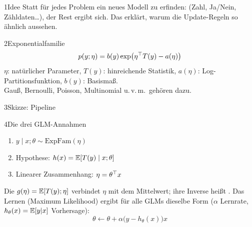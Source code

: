 
\begin{hngrid}
%
\begin{hnp}[raster multicolumn=2,acc=hnorange]{1}{Idee}
Statt für jedes Problem ein neues Modell zu erfinden:  (Zahl, Ja/Nein, Zähldaten\ldots), der Rest ergibt sich. Das erklärt, warum die Update-Regeln so ähnlich aussehen.
\end{hnp}
%
\begin{hnp}[raster multicolumn=2,acc=hnpurple]{2}{Exponentialfamilie}
\[ p(y;\eta)=b(y)\exp\bigl(\eta^{\top} T(y)-a(\eta)\bigr) \]
$\eta$: natürlicher Parameter, $T(y)$: hinreichende Statistik, $a(\eta)$: Log-Partitionsfunktion, $b(y)$: Basismaß.\\
Gauß, Bernoulli, Poisson, Multinomial u.\,v.\,m.\ gehören dazu.
\end{hnp}
%
\begin{hnp}[raster multicolumn=2,acc=hnteal]{3}{Skizze: Pipeline}
\centering
{}
\end{hnp}
%
\begin{hnp}[raster multicolumn=3,acc=hnnavy]{4}{Die drei GLM-Annahmen}
\begin{enumerate}
\item $y\mid x;\theta\sim\mathrm{ExpFam}(\eta)$
\item Hypothese: $h(x)=\mathbb{E}[T(y)\mid x;\theta]$
\item Linearer Zusammenhang: $\eta=\theta^{\top} x$
\end{enumerate}
Die  $g(\eta)=\mathbb{E}[T(y);\eta]$ verbindet $\eta$ mit dem Mittelwert; ihre Inverse heißt . Das Lernen (Maximum Likelihood) ergibt für alle GLMs dieselbe Form ($\alpha$ Lernrate, $h_\theta(x)=\mathbb{E}[y|x]$ Vorhersage):
\[ \theta\leftarrow\theta+\alpha\bigl(y-h_\theta(x)\bigr)x \]
\end{hnp}

\end{hngrid}
